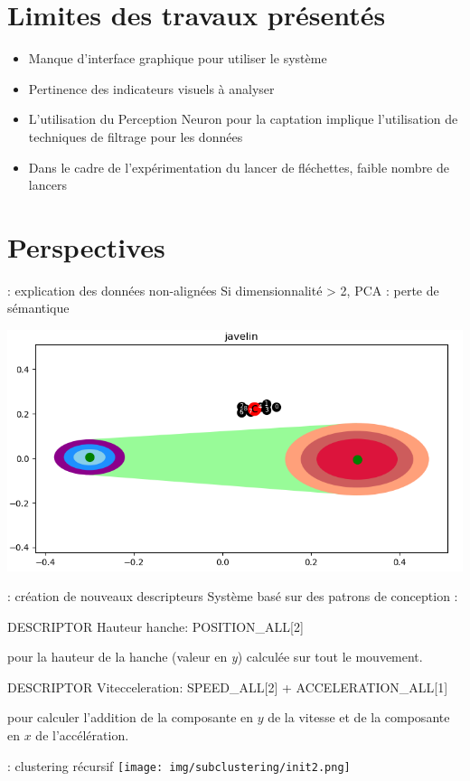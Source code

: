\documentclass[svgnames]{beamer}
\begin{document}
	\section{Limites des travaux présentés}
	\begin{frame}{\secname}
		\begin{itemize}[label=$\bullet$]
			\item Manque d'interface graphique pour utiliser le système
			\item Pertinence des indicateurs visuels à analyser
			\item L'utilisation du Perception Neuron pour la captation implique l'utilisation de techniques de filtrage pour les données
			\item Dans le cadre de l'expérimentation du lancer de fléchettes, faible nombre de lancers
		\end{itemize}
	\end{frame}
	
	\section{Perspectives}
	\begin{frame}{\secname : explication des données non-alignées}
		Si dimensionnalité > 2, PCA : perte de sémantique
		
		\centering
			\includegraphics[scale=0.5]{img/non_aligned_default.png}
	\end{frame}
	
	\begin{frame}{\secname : création de nouveaux descripteurs}
		Système basé sur des patrons de conception :
		
		\begin{framed}
		DESCRIPTOR Hauteur hanche: POSITION\_ALL[2]
		\end{framed}
		pour la hauteur de la hanche (valeur en \textit{y}) calculée sur tout le mouvement.\\

		\begin{framed}
		DESCRIPTOR Vitecceleration: SPEED\_ALL[2] + ACCELERATION\_ALL[1]
		\end{framed}
		pour calculer l'addition de la composante en $y$ de la vitesse et de la composante en $x$ de l'accélération.\\
	\end{frame}
	
	\begin{frame}{\secname : clustering récursif}
		\centering
		\texttt{[image: img/subclustering/init2.png]}
	\end{frame}
\end{document}
